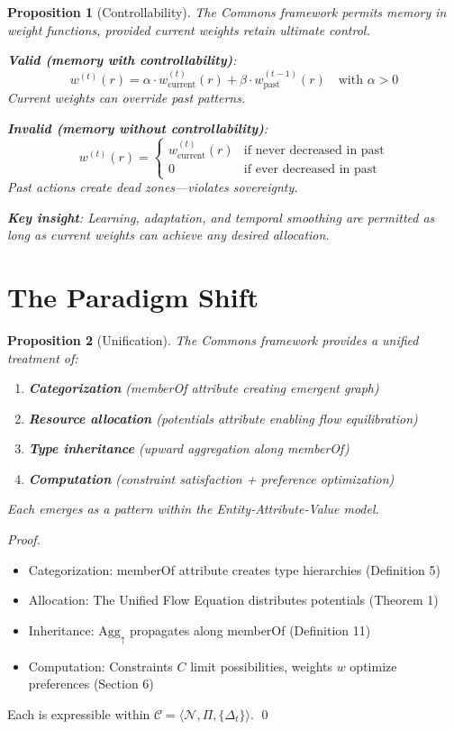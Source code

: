 \documentclass[11pt]{article}
\newtheorem{proposition}{Proposition}
\begin{document}
\begin{proposition}[Controllability]
\label{prop:controllability-commons}
The Commons framework permits memory in weight functions, provided current weights retain ultimate control.

\textbf{Valid (memory with controllability)}:
\[
w^{(t)}(r) = \alpha \cdot w_{\text{current}}^{(t)}(r) + \beta \cdot w_{\text{past}}^{(t-1)}(r) \quad \text{with } \alpha > 0
\]
Current weights can override past patterns.

\textbf{Invalid (memory without controllability)}:
\[
w^{(t)}(r) = \begin{cases}
w_{\text{current}}^{(t)}(r) & \text{if never decreased in past} \\
0 & \text{if ever decreased in past}
\end{cases}
\]
Past actions create dead zones—violates sovereignty.

\textbf{Key insight}: Learning, adaptation, and temporal smoothing are permitted as long as current weights can achieve any desired allocation.
\end{proposition}

\section{The Paradigm Shift}

\begin{proposition}[Unification]
The Commons framework provides a unified treatment of:
\begin{enumerate}
\item \textbf{Categorization} (memberOf attribute creating emergent graph)
\item \textbf{Resource allocation} (potentials attribute enabling flow equilibration)
\item \textbf{Type inheritance} (upward aggregation along memberOf)
\item \textbf{Computation} (constraint satisfaction + preference optimization)
\end{enumerate}
Each emerges as a pattern within the Entity-Attribute-Value model.
\end{proposition}

\begin{proof}
\begin{itemize}
\item Categorization: memberOf attribute creates type hierarchies (Definition 5)
\item Allocation: The Unified Flow Equation distributes potentials (Theorem 1)
\item Inheritance: $\text{Agg}_\uparrow$ propagates along memberOf (Definition 11)
\item Computation: Constraints $C$ limit possibilities, weights $w$ optimize preferences (Section 6)
\end{itemize}
Each is expressible within $\mathcal{C} = \langle \mathcal{N}, \Pi, \{\Delta_t\} \rangle$. \qed
\end{proof}
\end{document}
